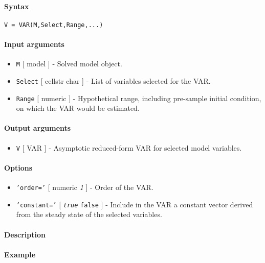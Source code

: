 


	\paragraph{Syntax}

\begin{verbatim}
V = VAR(M,Select,Range,...)
\end{verbatim}

\paragraph{Input arguments}

\begin{itemize}
\item
  \texttt{M} {[} model {]} - Solved model object.
\item
  \texttt{Select} {[} cellstr \textbar{} char {]} - List of variables
  selected for the VAR.
\item
  \texttt{Range} {[} numeric {]} - Hypothetical range, including
  pre-sample initial condition, on which the VAR would be estimated.
\end{itemize}

\paragraph{Output arguments}

\begin{itemize}
\itemsep1pt\parskip0pt
\item
  \texttt{V} {[} VAR {]} - Asymptotic reduced-form VAR for selected
  model variables.
\end{itemize}

\paragraph{Options}

\begin{itemize}
\item
  \texttt{'order='} {[} numeric \textbar{} \emph{1} {]} - Order of the
  VAR.
\item
  \texttt{'constant='} {[} \emph{\texttt{true}} \textbar{}
  \texttt{false} {]} - Include in the VAR a constant vector derived from
  the steady state of the selected variables.
\end{itemize}

\paragraph{Description}

\paragraph{Example}


